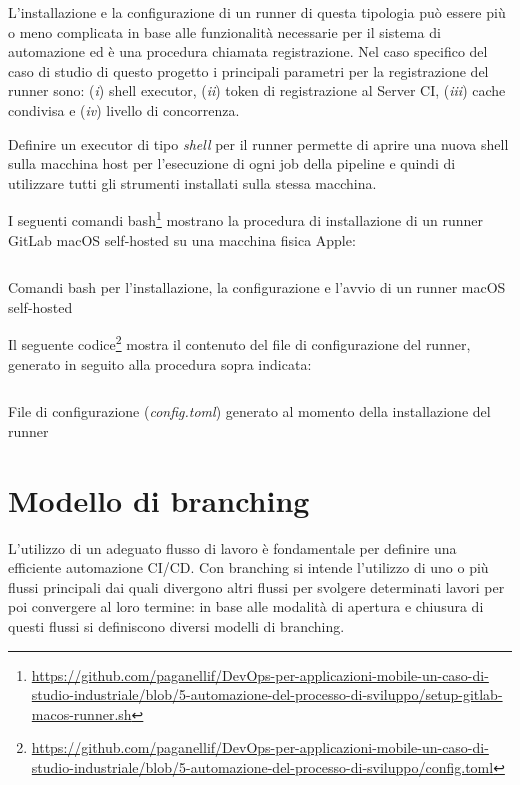 L'installazione e la configurazione di un runner di questa tipologia può essere più o meno complicata in base alle funzionalità necessarie per il sistema di automazione ed è una procedura chiamata registrazione. Nel caso specifico del caso di studio di questo progetto i principali parametri per la registrazione del runner sono: (\textit{i}) shell executor, (\textit{ii}) token di registrazione al Server CI, (\textit{iii}) cache condivisa e (\textit{iv}) livello di concorrenza.

Definire un executor di tipo \textit{shell} per il runner permette di aprire una nuova shell sulla macchina host per l'esecuzione di ogni job della pipeline e quindi di utilizzare tutti gli strumenti installati sulla stessa macchina.

I seguenti comandi bash\footnote{\href{https://github.com/paganellif/DevOps-per-applicazioni-mobile-un-caso-di-studio-industriale/blob/5-automazione-del-processo-di-sviluppo/setup-gitlab-macos-runner.sh}{https://github.com/paganellif/DevOps-per-applicazioni-mobile-un-caso-di-studio-industriale/blob/5-automazione-del-processo-di-sviluppo/setup-gitlab-macos-runner.sh}} mostrano la procedura di installazione di un runner GitLab macOS self-hosted su una macchina fisica Apple:
\begin{listing}[H]
    \inputminted{bash}{code/macos-runner-setup.sh}
    \caption{Comandi bash per l'installazione, la configurazione e l'avvio di un runner macOS self-hosted}
\end{listing}

Il seguente codice\footnote{\href{https://github.com/paganellif/DevOps-per-applicazioni-mobile-un-caso-di-studio-industriale/blob/5-automazione-del-processo-di-sviluppo/config.toml}{https://github.com/paganellif/DevOps-per-applicazioni-mobile-un-caso-di-studio-industriale/blob/5-automazione-del-processo-di-sviluppo/config.toml}} mostra il contenuto del file di configurazione del runner, generato in seguito alla procedura sopra indicata:

\begin{listing}[H]
    \inputminted{toml}{code/macos-runner-config.toml}
    \caption{File di configurazione (\textit{config.toml}) generato al momento della installazione del runner}
\end{listing}

\section{Modello di branching}
L’utilizzo di un adeguato flusso di lavoro è fondamentale per definire una efficiente automazione CI/CD. Con branching si intende l’utilizzo di uno o più flussi principali dai quali divergono altri flussi per svolgere determinati lavori per poi convergere al loro termine: in base alle modalità di apertura e chiusura di questi flussi si definiscono diversi modelli di branching.

